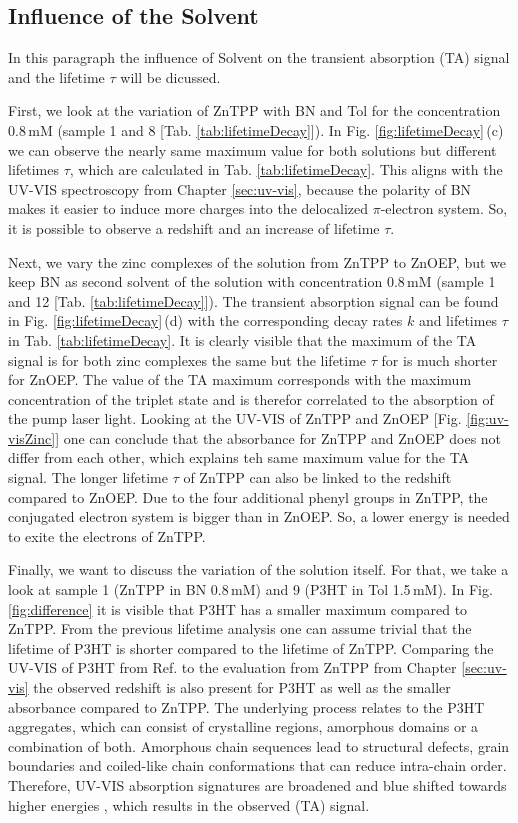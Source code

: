 \subsection{Influence of the Solvent}
\label{sub:difference}

In this paragraph the influence of Solvent on the transient absorption (TA) signal and the lifetime $\tau$ will be dicussed. 
\bigskip

First, we look at the variation of ZnTPP with BN and Tol for the concentration 0.8\,mM (sample 1 and 8 [Tab. \ref{tab:lifetimeDecay}]). In Fig. \ref{fig:lifetimeDecay}\,(c) we can observe the nearly same maximum value for both solutions but different lifetimes $\tau$, which are calculated in Tab. \ref{tab:lifetimeDecay}. This aligns with the UV-VIS spectroscopy from Chapter \ref{sec:uv-vis}, because the polarity of BN makes it easier to induce more charges into the delocalized $\pi$-electron system. So, it is possible to observe a redshift and an increase of lifetime $\tau$. 
\bigskip

Next, we vary the zinc complexes of the solution from ZnTPP to ZnOEP, but we keep BN as second solvent of the solution with concentration 0.8\,mM (sample 1 and 12 [Tab. \ref{tab:lifetimeDecay}]). The transient absorption signal can be found in Fig. \ref{fig:lifetimeDecay}\,(d) with the corresponding decay rates $k$ and lifetimes $\tau $ in Tab. \ref{tab:lifetimeDecay}. It is clearly visible that the maximum of the TA signal is for both zinc complexes the same but the lifetime $\tau$ for is much shorter for ZnOEP. The value of the TA maximum corresponds with the maximum concentration of the triplet state and is therefor correlated to the absorption of the pump laser light. Looking at the UV-VIS of ZnTPP and ZnOEP [Fig. \ref{fig:uv-visZinc}] one can conclude that the absorbance for ZnTPP and ZnOEP does not differ from each other, which explains teh same maximum value for the TA signal. The longer lifetime $\tau$ of ZnTPP can also be linked to the redshift compared to ZnOEP. Due to the four additional phenyl groups in ZnTPP, the conjugated electron system is bigger than in ZnOEP. So, a lower energy is needed to exite the electrons of ZnTPP.
\bigskip

Finally, we want to discuss the variation of the solution itself. For that, we take a look at sample 1 (ZnTPP in BN 0.8\,mM) and 9 (P3HT in Tol 1.5\,mM). In Fig. \ref{fig:difference} it is visible that P3HT has a smaller maximum compared to ZnTPP. From the previous lifetime analysis one can assume trivial that the lifetime of P3HT is shorter compared to the lifetime of ZnTPP. Comparing the UV-VIS of P3HT from Ref.  to the evaluation from ZnTPP from Chapter \ref{sec:uv-vis} the observed redshift is also present for P3HT as well as the smaller absorbance compared to ZnTPP. The underlying process relates to the P3HT aggregates, which can consist of crystalline regions, amorphous domains or a combination of both. Amorphous chain sequences lead to structural defects, grain boundaries and coiled-like chain conformations that can reduce intra-chain order. Therefore, UV-VIS absorption signatures are broadened and blue shifted towards higher energies \cite{Rahimi2014}, which results in the observed (TA) signal.

